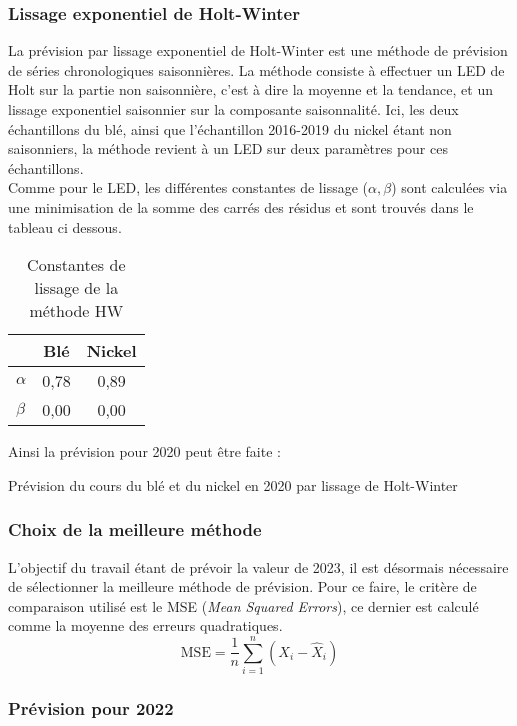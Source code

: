 \subsubsection*{Lissage exponentiel de Holt-Winter}
La prévision par lissage exponentiel de Holt-Winter est une méthode de prévision de séries chronologiques saisonnières. La méthode consiste à effectuer un LED de Holt 
sur la partie non saisonnière, c'est à dire la moyenne et la tendance, et un lissage exponentiel saisonnier sur la composante saisonnalité. Ici, les deux échantillons du
blé, ainsi que l'échantillon 2016-2019 du nickel étant non saisonniers, la méthode revient à un LED sur deux paramètres pour ces échantillons.\\[11pt] 
Comme pour le LED, les différentes constantes de lissage ($\alpha, \beta$) sont calculées via une minimisation de la somme des carrés des résidus et sont trouvés dans le 
tableau ci dessous.
\begin{table}[H]
    \centering
    \caption{Constantes de lissage de la méthode HW}
    \sffamily
    \begin{tabular}{lcc}
        \toprule
        & Blé & Nickel\\
        \midrule
        $\alpha$ & 0,78 & 0,89 \\
        $\beta$ & 0,00 & 0,00\\
        \bottomrule
    \end{tabular}
\end{table}
Ainsi la prévision pour 2020 peut être faite :
\begin{table}[H]
    \centering
    \caption{Prévision du cours du blé et du nickel en 2020 par lissage de Holt-Winter}
    \sffamily
    
\end{table}
\subsubsection{Choix de la meilleure méthode}
L'objectif du travail étant de prévoir la valeur de 2023, il est désormais nécessaire de sélectionner la meilleure méthode de prévision. Pour ce faire, le critère
de comparaison utilisé est le MSE (\textit{Mean Squared Errors}), ce dernier est calculé comme la moyenne des erreurs quadratiques.
\begin{equation*}
    \text{MSE} = \frac{1}{n} \sum_{i=1}^{n} (X_{i} - \hat{X}_{i})
\end{equation*}

\subsubsection{Prévision pour 2022}

